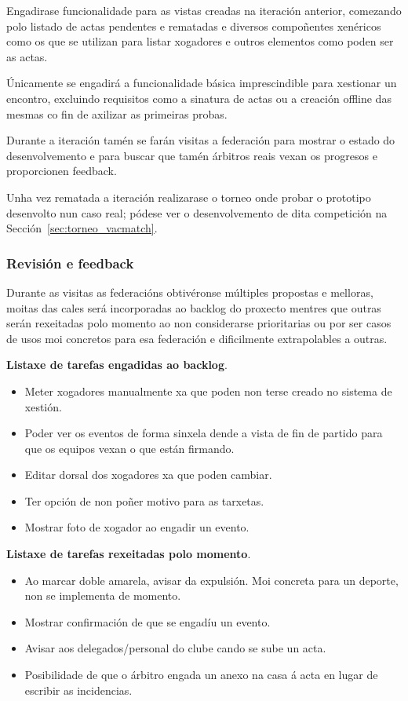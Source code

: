       Engadirase funcionalidade para as vistas creadas na iteración anterior, 
comezando polo listado de actas pendentes e rematadas e diversos compoñentes 
xenéricos como os que se utilizan para listar xogadores e outros elementos como 
poden ser as actas.

      Únicamente se engadirá a funcionalidade básica imprescindible para 
xestionar un encontro, excluindo requisitos como a sinatura de actas ou a 
creación offline das mesmas co fin de axilizar as primeiras probas.

      Durante a iteración tamén se farán visitas a federación para mostrar o 
estado do desenvolvemento e para buscar que tamén árbitros reais vexan os 
progresos e proporcionen feedback.

      Unha vez rematada a iteración realizarase o torneo onde probar o 
prototipo desenvolto nun caso real; pódese ver o desenvolvemento de dita 
competición na Sección~\ref{sec:torneo_vacmatch}.

      \subsubsection{Revisión e feedback}
      Durante as visitas as federacións obtivéronse múltiples propostas e 
melloras, moitas das cales será incorporadas ao backlog do proxecto mentres que 
outras serán rexeitadas polo momento ao non considerarse prioritarias ou por 
ser casos de usos moi concretos para esa federación e dificilmente 
extrapolables a outras.

      \textbf{Listaxe de tarefas engadidas ao backlog}.
        \begin{itemize}
          \item Meter xogadores manualmente xa que poden non terse creado no 
sistema de xestión.
          \item Poder ver os eventos de forma sinxela dende a vista de fin de 
partido para que os equipos vexan o que están firmando.
         \item Editar dorsal dos xogadores xa que poden cambiar.
         \item Ter opción de non poñer motivo para as tarxetas.
         \item Mostrar foto de xogador ao engadir un evento.
        \end{itemize}

      \textbf{Listaxe de tarefas rexeitadas polo momento}.
        \begin{itemize}
         \item Ao marcar doble amarela, avisar da expulsión. Moi concreta para 
un deporte, non se implementa de momento.
         \item Mostrar confirmación de que se engadíu un evento.
         \item Avisar aos delegados/personal do clube cando se sube un acta.
         \item Posibilidade de que o árbitro engada un anexo na casa á acta en 
lugar de escribir as incidencias.
        \end{itemize}

